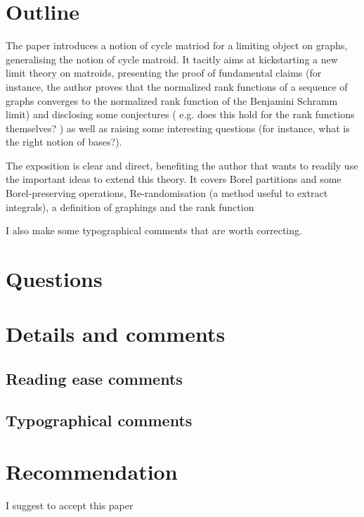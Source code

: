 \documentclass[12pt]{article}
\begin{document}
\maketitle




\section*{Outline}

The paper introduces a notion of cycle matriod for a  limiting object on graphs, generalising the notion of cycle matroid.
It tacitly aims at kickstarting a new limit theory on matroids, presenting the proof of fundamental claims (for instance, the author proves that the  normalized rank functions of a sequence of graphs converges to the normalized rank function of the Benjamini Schramm limit) and disclosing some conjectures ( e.g. does this hold for the rank functions themselves? ) as well as raising some interesting questions (for instance, what is the right notion of bases?).

The exposition is clear and direct, benefiting the author that wants to readily use the important ideas to extend this theory.
It covers Borel partitions and some Borel-preserving operations, Re-randomisation (a method useful to extract integrals), a definition of graphings and the rank function

I also make some typographical comments that are worth correcting.

\section*{Questions}

\begin{itemize}

\end{itemize}


\section*{Details and comments}


\subsection*{Reading ease comments}

\begin{itemize}

\end{itemize}


\subsection*{Typographical comments}

\begin{itemize}

\end{itemize}

\section*{Recommendation}
I suggest to accept this paper 





\end{document}
